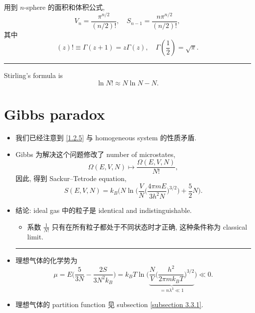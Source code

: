 \begin{itemize}
	\begin{tcolorbox}[title=calculation:]
		用到 $n$-sphere 的面积和体积公式,
		\begin{equation}
			V_n = \frac{\pi^{n / 2}}{(n / 2)!}, \quad S_{n - 1} = \frac{n \pi^{n / 2}}{(n / 2)!},
		\end{equation}
		其中
		\begin{equation}
			(z)! \equiv \Gamma(z + 1) = z \Gamma(z), \quad \Gamma(\frac{1}{2}) = \sqrt{\pi}.
		\end{equation}
		
		\noindent\rule[0.5ex]{\linewidth}{0.5pt} %
		
		Stirling's formula is
		\begin{equation}
			\ln N! \approx N \ln N - N.
		\end{equation}
	\end{tcolorbox}
\end{itemize}

\section{Gibbs paradox}
\begin{itemize}
	\item 我们已经注意到 \eqref{1.2.5} 与 homogeneous system 的性质矛盾.
	
	\item Gibbs 为解决这个问题修改了 number of microstates,
	\begin{equation}
		\Omega(E, V, N) \mapsto \frac{\Omega(E, V, N)}{N!},
	\end{equation}
	因此, 得到 Sackur--Tetrode equation,
	\begin{equation}
		S(E, V, N) = k_B \bigg( N \ln \bigg( \frac{V}{N} \Big( \frac{4 \pi m E}{3 h^2 N} \Big)^{3 / 2} \bigg) + \frac{5}{2} N \bigg).
	\end{equation}
	
	\item 结论: ideal gas 中的粒子是 identical and indistinguishable.
	\begin{itemize}
		\item 系数 $\frac{1}{N!}$ 只有在所有粒子都处于不同状态时才正确, 这种条件称为 classical limit.
	\end{itemize}
	
	\noindent\rule[0.5ex]{\linewidth}{0.5pt} %
	
	\item 理想气体的化学势为
	\begin{equation} \label{1.3.3}
		\mu = E \Big( \frac{5}{3 N} - \frac{2 S}{3 N^2 k_B} \Big) = k_B T \ln \Big( \underbrace{\frac{N}{V} \Big( \frac{h^2}{2 \pi m k_B T} \Big)^{3 / 2}}_{= n \lambda^3 \ll 1} \Big) \ll 0.
	\end{equation}
	
	\item 理想气体的 partition function 见 subsection \ref{subsection 3.3.1}.
\end{itemize}

